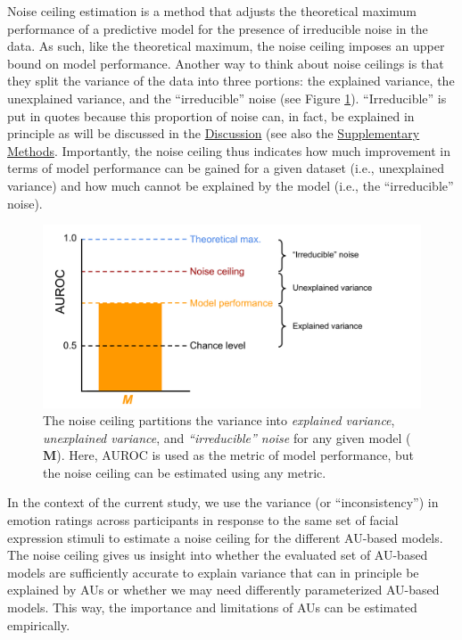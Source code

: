\documentclass[11pt,american,a4paper,oneside,]{memoir} %
\begin{document}
Noise ceiling estimation is a method that adjusts the theoretical maximum performance of a predictive model for the presence of irreducible noise in the data. As such, like the theoretical maximum, the noise ceiling imposes an upper bound on model performance. Another way to think about noise ceilings is that they split the variance of the data into three portions: the explained variance, the unexplained variance, and the ``irreducible'' noise (see Figure \ref{fig:fig-hka-3}). ``Irreducible'' is put in quotes because this proportion of noise can, in fact, be explained in principle as will be discussed in the \protect\hyperlink{kha-discussion}{Discussion} (see also the \protect\hyperlink{hypothesis-kernel-analysis-supplement}{Supplementary Methods}. Importantly, the noise ceiling thus indicates how much improvement in terms of model performance can be gained for a given dataset (i.e., unexplained variance) and how much cannot be explained by the model (i.e., the ``irreducible'' noise).

\begin{figure}
\centering
\includegraphics{_bookdown_files/hypothesis-kernel-analysis-files/figures/figure_3.pdf}
\caption{\label{fig:fig-hka-3}The noise ceiling partitions the variance into \emph{explained variance}, \emph{unexplained variance}, and \emph{``irreducible'' noise} for any given model (\(\mathbf{M}\)). Here, AUROC is used as the metric of model performance, but the noise ceiling can be estimated using any metric.}
\end{figure}



In the context of the current study, we use the variance (or ``inconsistency'') in emotion ratings across participants in response to the same set of facial expression stimuli to estimate a noise ceiling for the different AU-based models. The noise ceiling gives us insight into whether the evaluated set of AU-based models are sufficiently accurate to explain variance that can in principle be explained by AUs or whether we may need differently parameterized AU-based models. This way, the importance and limitations of AUs can be estimated empirically.
\end{document}
